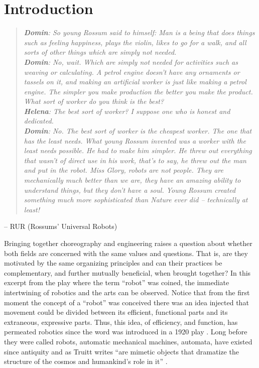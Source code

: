 \documentclass[arts,article,submit,moreauthors,pdftex,10pt,a4paper]{mdpi}
\begin{document}


\section{Introduction}\label{intro}

 

\begin{quote}
\textit{\textbf{Domin}: So young Rossum said to himself: Man is a being that does things such as feeling happiness, plays the violin, likes to go for a walk, and all sorts of other things which are simply not needed.\\
\textbf{Domin}: No, wait.  Which are simply not needed for activities such as weaving or calculating.  A petrol engine doesn't have any ornaments or tassels on it, and making an artificial worker is just like making a petrol engine.  The simpler you make production the better you make the product.  What sort of worker do you think is the best?\\
\textbf{Helena}: The best sort of worker?  I suppose one who is honest and dedicated.\\
\textbf{Domin}: No.  The best sort of worker is the cheapest worker.  The one that has the least needs.  What young Rossum invented was a worker with the least needs possible.  He had to make him simpler.  He threw out everything that wasn't of direct use in his work, that's to say, he threw out the man and put in the robot.  Miss Glory, robots are not people.  They are mechanically much better than we are, they have an amazing ability to understand things, but they don't have a soul.  Young Rossum created something much more sophisticated than Nature ever did -- technically at least!}
\end{quote}
\vspace{-.2in}
\begin{flushright}
-- RUR (Rossums’ Universal Robots) \cite{vcapek2004rur}
\end{flushright}

Bringing together choreography and engineering raises a question about whether both fields are concerned with the same values and questions. That is, are they motivated by the same organizing principles and can their practices be complementary, and further mutually beneficial, when brought together? 
In this excerpt from the play where the term ``robot'' was coined, the immediate intertwining of robotics and the arts can be observed.  Notice that from the first moment the concept of a ``robot'' was conceived there was an idea injected that movement could be divided between its efficient, functional parts and its extraneous, expressive parts.  Thus, this idea, of efficiency, and function, has permeated robotics since the word was introduced in a 1920 play \cite{vcapek2004rur}.  Long before they were called robots, automatic mechanical machines, automata, have existed since antiquity and as Truitt writes ``are mimetic objects that dramatize the structure of the cosmos and humankind's role in it'' \cite{truitt2015medieval}.
\end{document}
